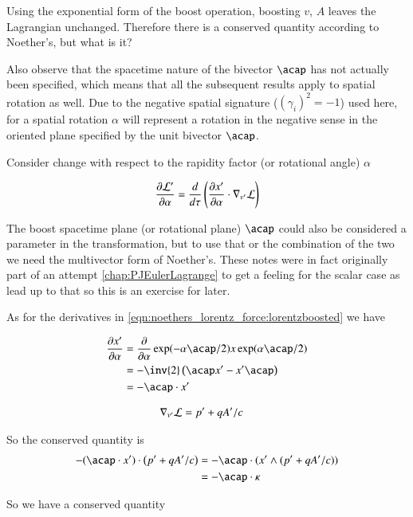 Using the exponential form of the boost operation, boosting $v$, $A$ leaves the Lagrangian unchanged.
Therefore there is a conserved quantity according to Noether's, but what is it?

Also observe that the spacetime nature of the bivector $\acap$ has not actually been specified, which means that all the
subsequent results apply to spatial rotation as well.  Due to the negative spatial signature ($(\gamma_i)^2=-1$) used here, for a spatial rotation $\alpha$ will represent a rotation in the negative sense in the oriented plane specified by the unit bivector $\acap$.

Consider change with respect to the rapidity factor (or rotational angle) $\alpha$

\begin{align}\label{eqn:noethers_lorentz_force:lorentzboosted}
\frac{\partial {\mathcal{L}'}}{\partial {\alpha}} = \frac{d}{d\tau} \left( \frac{\partial {x'}}{\partial {\alpha}} \cdot \nabla_{v'} \mathcal{L} \right)
\end{align}

The boost spacetime plane (or rotational plane) $\acap$ could also be considered a parameter in the transformation, but to use that or the combination of the
two we need the multivector form of Noether's.  These notes were in fact originally part of an attempt \ref{chap:PJEulerLagrange}
to get a feeling for the scalar case as lead up to that so this is an exercise for later.

As for the derivatives in \ref{eqn:noethers_lorentz_force:lorentzboosted} we have

\begin{align*}
\PD{\alpha}{x'} 
&= \PD{\alpha}{} \exp(-\alpha \acap/2) x \exp(\alpha \acap/2) \\
&= -\inv{2} \left(\acap x' - x'\acap\right) \\
&= - \acap \cdot x' \\
\end{align*}

\begin{align*}
\nabla_{v'} \mathcal{L} &= p' + qA'/c
\end{align*}

So the conserved quantity is
\begin{align*}
- (\acap \cdot x') \cdot \left( p' + qA'/c \right)
&= - \acap \cdot (x' \wedge (p' + qA'/c ) ) \\
&= -\acap \cdot \kappa
\end{align*}

So we have a conserved quantity

